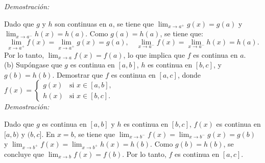 \textit{Demostración:}

Dado que $g$ y $h$ son continuas en $a$, se tiene que $\lim_{x \to a^+} g(x) = g(a)$ y $\lim_{x \to a^-} h(x) = h(a)$. Como $g(a) = h(a)$, se tiene que:
\[
\lim_{x \to a^+} f(x) = \lim_{x \to a^+} g(x) = g(a), \quad \lim_{x \to a^-} f(x) = \lim_{x \to a^-} h(x) = h(a).
\]
Por lo tanto, $\lim_{x \to a} f(x) = f(a)$, lo que implica que $f$ es continua en $a$.\\

(b) Supóngase que $g$ es continua en $[a, b]$, $h$ es continua en $[b, c]$, y $g(b) = h(b)$. Demostrar que $f$ es continua en $[a, c]$, donde $f(x) = \begin{cases} g(x) & \text{si } x \in [a, b], \\ h(x) & \text{si } x \in [b, c]. \end{cases}$\\

\textit{Demostración:}

Dado que $g$ es continua en $[a, b]$ y $h$ es continua en $[b, c]$, $f(x)$ es continua en $[a, b)$ y $(b, c]$. En $x = b$, se tiene que $\lim_{x \to b^-} f(x) = \lim_{x \to b^-} g(x) = g(b)$ y $\lim_{x \to b^+} f(x) = \lim_{x \to b^+} h(x) = h(b)$. Como $g(b) = h(b)$, se concluye que $\lim_{x \to b} f(x) = f(b)$. Por lo tanto, $f$ es continua en $[a, c]$.